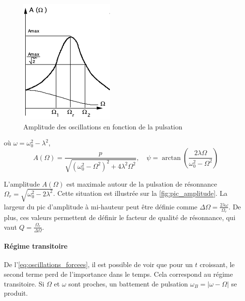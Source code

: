 \begin{figure}
    \vspace*{-0.5cm}
    \centering
    \includegraphics[width=\linewidth]{figures/pic_amplitude.png}
    \caption{Amplitude des oscillations en fonction de la pulsation \cite{notice}}
    \label{fig:pic_amplitude}
    \vspace*{-2cm}
\end{figure}
où \(\omega = \omega_0^2 - \lambda^2\), 
\begin{equation}
    A(\Omega) = \frac{p}{\sqrt{\left(\omega_0^2-\Omega^2\right)^2 + 4\lambda^2\Omega^2}}, \quad \psi = \arctan \left(\frac{2\lambda\Omega}{\omega_0^2-\Omega^2}\right)
\end{equation}

L'amplitude \(A(\Omega)\) est maximale autour de la pulsation de résonnance \(\Omega_r = \sqrt{\omega_0^2-2\lambda^2}\). Cette situation est illustrée sur la \autoref{fig:pic_amplitude}. La largeur du pic d'amplitude à mi-hauteur peut être définie comme \(\Delta \Omega = \frac{2 \lambda \omega}{\Omega_r}\). De plus, ces valeurs permettent de définir le facteur de qualité de résonnance, qui vaut \(Q = \frac{\Omega_r}{\Delta\Omega}\).

\paragraph*{Régime transitoire}
De l'\autoref{eq:oscillations_forcees}, il est possible de voir que pour un \(t\) croissant, le second terme perd de l'importance dans le temps. Cela correspond au régime transitoire. Si \(\Omega\) et \(\omega\) sont proches, un battement de pulsation \(\omega_B = |\omega- \Omega|\) se produit.
